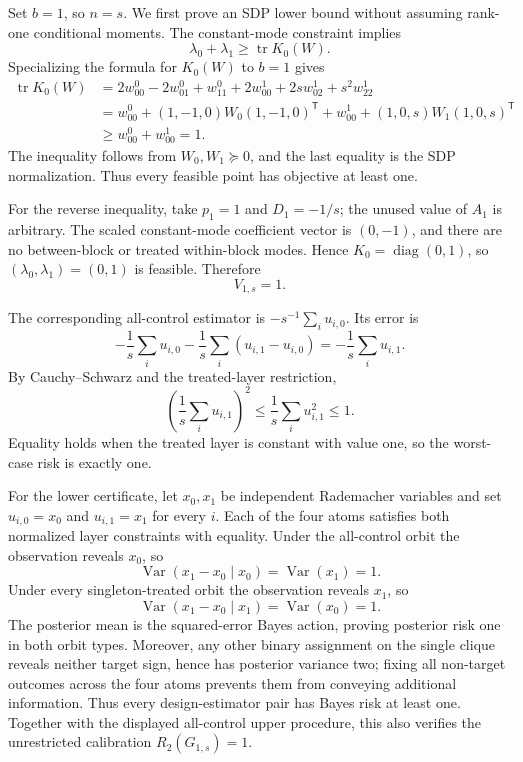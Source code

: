 Set \(b=1\), so \(n=s\). We first prove an SDP lower bound without assuming rank-one conditional moments. The constant-mode constraint implies
\[
\lambda_0+\lambda_1\geq\operatorname{tr}K_0(W).
\]
Specializing the formula for \(K_0(W)\) to \(b=1\) gives
\[
\begin{aligned}
\operatorname{tr}K_0(W)
&=2w^0_{00}-2w^0_{01}+w^0_{11}
  +2w^1_{00}+2sw^1_{02}+s^2w^1_{22}\\
&=w^0_{00}+(1,-1,0)W_0(1,-1,0)^{\mathsf T}
  +w^1_{00}+(1,0,s)W_1(1,0,s)^{\mathsf T}\\
&\geq w^0_{00}+w^1_{00}=1.
\end{aligned}
\]
The inequality follows from \(W_0,W_1\succeq0\), and the last equality is the SDP normalization. Thus every feasible point has objective at least one.

For the reverse inequality, take \(p_1=1\) and \(D_1=-1/s\); the unused value of \(A_1\) is arbitrary. The scaled constant-mode coefficient vector is \((0,-1)\), and there are no between-block or treated within-block modes. Hence \(K_0=\operatorname{diag}(0,1)\), so \((\lambda_0,\lambda_1)=(0,1)\) is feasible. Therefore
\[
V_{1,s}=1.
\]

The corresponding all-control estimator is \(-s^{-1}\sum_i u_{i,0}\). Its error is
\[
-\frac1s\sum_i u_{i,0}
-\frac1s\sum_i(u_{i,1}-u_{i,0})
=-\frac1s\sum_i u_{i,1}.
\]
By Cauchy--Schwarz and the treated-layer restriction,
\[
\left(\frac1s\sum_i u_{i,1}\right)^2
\leq\frac1s\sum_i u_{i,1}^2\leq1.
\]
Equality holds when the treated layer is constant with value one, so the worst-case risk is exactly one.

For the lower certificate, let \(x_0,x_1\) be independent Rademacher variables and set \(u_{i,0}=x_0\) and \(u_{i,1}=x_1\) for every \(i\). Each of the four atoms satisfies both normalized layer constraints with equality. Under the all-control orbit the observation reveals \(x_0\), so
\[
\operatorname{Var}(x_1-x_0\mid x_0)=\operatorname{Var}(x_1)=1.
\]
Under every singleton-treated orbit the observation reveals \(x_1\), so
\[
\operatorname{Var}(x_1-x_0\mid x_1)=\operatorname{Var}(x_0)=1.
\]
The posterior mean is the squared-error Bayes action, proving posterior risk one in both orbit types. Moreover, any other binary assignment on the single clique reveals neither target sign, hence has posterior variance two; fixing all non-target outcomes across the four atoms prevents them from conveying additional information. Thus every design-estimator pair has Bayes risk at least one. Together with the displayed all-control upper procedure, this also verifies the unrestricted calibration \(R_2(G_{1,s})=1\).